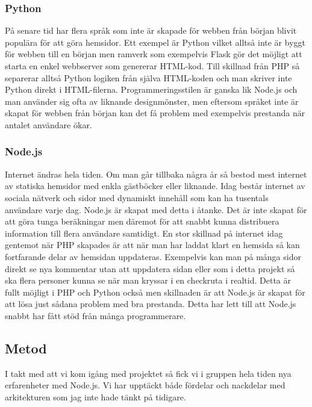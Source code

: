 \subsubsection{Python}

På senare tid har flera språk som inte är skapade för webben från början blivit populära för att göra hemsidor. Ett exempel är Python vilket alltså inte är byggt för webben till en början men ramverk som exempelvis Flask\cite{python_flask} gör det möjligt att starta en enkel webbserver som genererar HTML-kod. Till skillnad från PHP så separerar alltså Python logiken från själva HTML-koden och man skriver inte Python direkt i HTML-filerna. Programmeringsstilen är ganska lik Node.js och man använder sig ofta av liknande designmönster, men eftersom språket inte är skapat för webben från början kan det få problem med exempelvis prestanda när antalet användare ökar.

\subsubsection{Node.js}
Internet ändras hela tiden. Om man går tillbaka några år så bestod mest internet av statiska hemsidor med enkla gästböcker eller liknande. Idag består internet av sociala nätverk och sidor med dynamiskt innehåll som kan ha tusentals användare varje dag. Node.js är skapat med detta i åtanke. Det är inte skapat för att göra tunga beräkningar men däremot för att snabbt kunna distribuera information till flera användare samtidigt. En stor skillnad på internet idag gentemot när PHP skapades är att när man har laddat klart en hemsida så kan fortfarande delar av hemsidan uppdateras. Exempelvis kan man på många sidor direkt se nya kommentar utan att uppdatera sidan eller som i detta projekt så ska flera personer kunna se när man kryssar i en checkruta i realtid. Detta är fullt möjligt i PHP och Python också men skillnaden är att Node.js är skapat för att lösa just sådana problem med bra prestanda. Detta har lett till att Node.js snabbt har fått stöd från många programmerare\cite{node_performance}.

\subsection{Metod}

I takt med att vi kom igång med projektet så fick vi i gruppen hela tiden nya erfarenheter med Node.js. Vi har upptäckt både fördelar och nackdelar med arkitekturen som jag inte hade tänkt på tidigare. 

